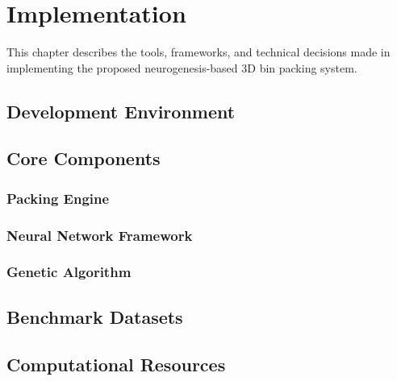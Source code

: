 \chapter{Implementation}

This chapter describes the tools, frameworks, and technical decisions made in implementing the proposed neurogenesis-based 3D bin packing system.

\section{Development Environment}


\section{Core Components}

\subsection{Packing Engine}


\subsection{Neural Network Framework}


\subsection{Genetic Algorithm}


\section{Benchmark Datasets}


\section{Computational Resources}

